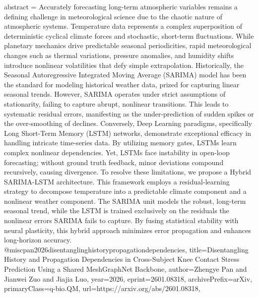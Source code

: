 {      abstract = {Accurately forecasting long-term atmospheric variables remains a defining challenge in meteorological science due to the chaotic nature of atmospheric systems. Temperature data represents a complex superposition of deterministic cyclical climate forces and stochastic, short-term fluctuations. While planetary mechanics drive predictable seasonal periodicities, rapid meteorological changes such as thermal variations, pressure anomalies, and humidity shifts introduce nonlinear volatilities that defy simple extrapolation. Historically, the Seasonal Autoregressive Integrated Moving Average (SARIMA) model has been the standard for modeling historical weather data, prized for capturing linear seasonal trends. However, SARIMA operates under strict assumptions of stationarity, failing to capture abrupt, nonlinear transitions. This leads to systematic residual errors, manifesting as the under-prediction of sudden spikes or the over-smoothing of declines. Conversely, Deep Learning paradigms, specifically Long Short-Term Memory (LSTM) networks, demonstrate exceptional efficacy in handling intricate time-series data. By utilizing memory gates, LSTMs learn complex nonlinear dependencies. Yet, LSTMs face instability in open-loop forecasting; without ground truth feedback, minor deviations compound recursively, causing divergence. To resolve these limitations, we propose a Hybrid SARIMA-LSTM architecture. This framework employs a residual-learning strategy to decompose temperature into a predictable climate component and a nonlinear weather component. The SARIMA unit models the robust, long-term seasonal trend, while the LSTM is trained exclusively on the residuals the nonlinear errors SARIMA fails to capture. By fusing statistical stability with neural plasticity, this hybrid approach minimizes error propagation and enhances long-horizon accuracy.}
}@misc{pan2026disentanglinghistorypropagationdependencies,
      title={Disentangling History and Propagation Dependencies in Cross-Subject Knee Contact Stress Prediction Using a Shared MeshGraphNet Backbone}, 
      author={Zhengye Pan and Jianwei Zuo and Jiajia Luo},
      year={2026},
      eprint={2601.08318},
      archivePrefix={arXiv},
      primaryClass={q-bio.QM},
      url={https://arxiv.org/abs/2601.08318},
}
